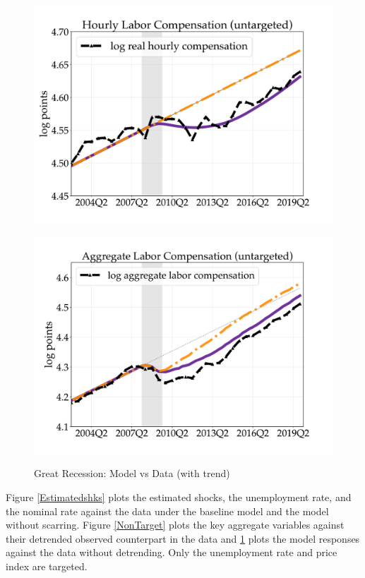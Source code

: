 \begin{figure}[H]
\begin{minipage}{0.51\textwidth}
\includegraphics[scale=.29]{text/chapter1/Figures/GR_sim/Cleaner/hourly_comp_vs_data_large_new}
 \label{fig:e}
\end{minipage}\hspace*{\fill}
\begin{minipage}{0.51\textwidth}
\includegraphics[scale=.29]{text/chapter1/Figures/GR_sim/Cleaner/labor_comp_vs_data_large_new}
 \label{fig:f}
\end{minipage}
\caption{Great Recession: Model vs Data (with trend)}
\label{NonTarget_with_trend}
\end{figure}


Figure \ref{Estimatedshks} plots the estimated shocks, the unemployment rate, and the nominal rate against the data under the baseline model and the model without scarring. Figure \ref{NonTarget} plots the key aggregate variables against their detrended observed counterpart in the data and \ref{NonTarget_with_trend} plots the model responses against the data without detrending. Only the unemployment rate and price index are targeted. 

